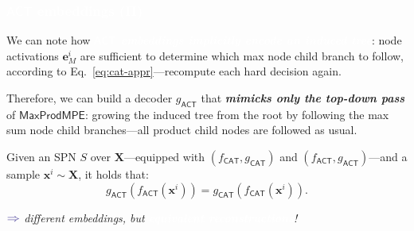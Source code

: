 \documentclass[xcolor={usenames,dvipsnames,svgnames}, compress]{beamer}
\newcommand{\highlighttext}[2][yellow]{{\colorbox{#1}{\textcolor{white}{#2}}}}
\begin{document}
\begin{frame}[t]
  \frametitle{\highlighttext[bgrey2]{$\mathsf{ACT}$ embeddings (II)}}
  \footnotesize
  We can note how \highlighttext[tomato0]{\textbf{\emph{$\mathsf{ACT}$ embeddings implicitly encode an induced tree}}}: 
node activations $\mathbf{e}^{i}_{M}$ are sufficient to determine
which max node child branch to follow, according to
Eq.~\ref{eq:cat-appr}---recompute each hard decision again.\par\bigskip

Therefore, we can build a decoder $g_{\mathsf{ACT}}$ that \emph{\textbf{mimicks only
the
top-down pass}} of $\mathsf{MaxProdMPE}$: growing the induced tree from
the root by following the max sum node child branches---all product
child nodes are followed as usual.\par\bigskip

Given an SPN $S$ over $\mathbf{X}$---equipped with $(f_{\mathsf{CAT}},
g_{\mathsf{CAT}})$ and $(f_{\mathsf{ACT}}, g_{\mathsf{ACT}})$---and a sample $\mathbf{x}^{i}\sim \mathbf{X}$, 
  it holds
  that:
  \begin{equation}
  g_{\mathsf{ACT}}(f_{\mathsf{ACT}}(\mathbf{x}^{i}))=g_{\mathsf{CAT}}(f_{\mathsf{CAT}}(\mathbf{x}^{i})).\label{eq:cat-act-eq}
\end{equation}
  \begin{minipage}{1.0\linewidth}
      \raggedleft
      $\color{violet}\boldsymbol\Rightarrow$
      \scriptsize
     \emph{different embeddings, but \highlighttext[tomato0]{\textbf{\emph{equivalent reconstructions}}}!}
   \end{minipage}
\end{frame}
\end{document}
